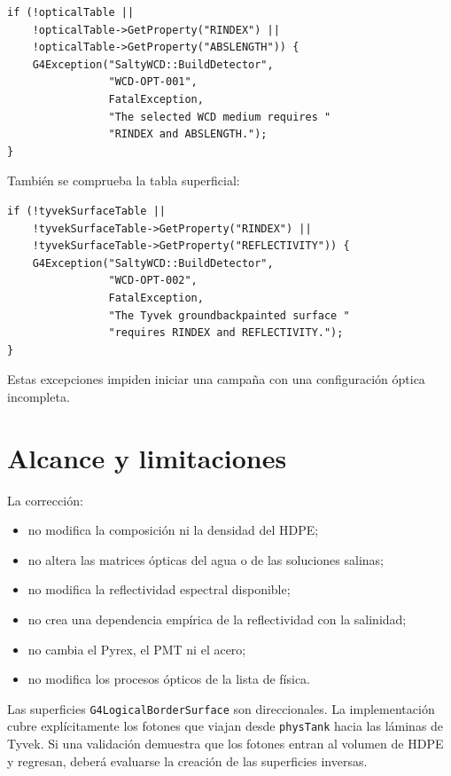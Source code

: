 \documentclass[11pt,a4paper]{article}
\newcommand{\codigo}[1]{\nolinkurl{#1}}
\begin{document}
\begin{lstlisting}
if (!opticalTable ||
    !opticalTable->GetProperty("RINDEX") ||
    !opticalTable->GetProperty("ABSLENGTH")) {
    G4Exception("SaltyWCD::BuildDetector",
                "WCD-OPT-001",
                FatalException,
                "The selected WCD medium requires "
                "RINDEX and ABSLENGTH.");
}
\end{lstlisting}

También se comprueba la tabla superficial:

\begin{lstlisting}
if (!tyvekSurfaceTable ||
    !tyvekSurfaceTable->GetProperty("RINDEX") ||
    !tyvekSurfaceTable->GetProperty("REFLECTIVITY")) {
    G4Exception("SaltyWCD::BuildDetector",
                "WCD-OPT-002",
                FatalException,
                "The Tyvek groundbackpainted surface "
                "requires RINDEX and REFLECTIVITY.");
}
\end{lstlisting}

Estas excepciones impiden iniciar una campaña con una configuración óptica
incompleta.

\section{Alcance y limitaciones}

La corrección:

\begin{itemize}
  \item no modifica la composición ni la densidad del HDPE;
  \item no altera las matrices ópticas del agua o de las soluciones salinas;
  \item no modifica la reflectividad espectral disponible;
  \item no crea una dependencia empírica de la reflectividad con la salinidad;
  \item no cambia el Pyrex, el PMT ni el acero;
  \item no modifica los procesos ópticos de la lista de física.
\end{itemize}

Las superficies \codigo{G4LogicalBorderSurface} son direccionales. La
implementación cubre explícitamente los fotones que viajan desde
\codigo{physTank} hacia las láminas de Tyvek. Si una validación demuestra que
los fotones entran al volumen de HDPE y regresan, deberá evaluarse la creación
de las superficies inversas.
\end{document}
